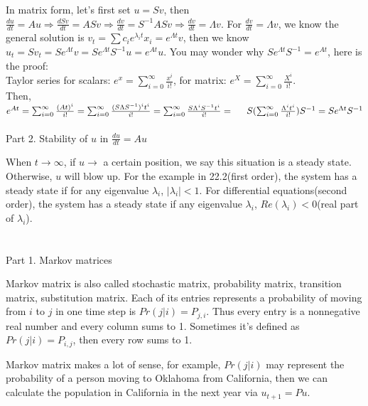 \documentclass{article}
\begin{document}
\begin{spacing}{1.5}
In matrix form, let's first set $u=Sv$, then $\frac{du}{dt}=Au \Rightarrow \frac{dSv}{dt}=ASv \Rightarrow \frac{dv}{dt}=S^{-1}ASv \Rightarrow \frac{dv}{dt}=
\Lambda v$. For $\frac{dv}{dt}=\Lambda v$, we know the general solution is $v_t=\sum c_i e^{\lambda_i t} x_i=e^{\Lambda t}v$, then we know $u_t=Sv_t=Se^{\Lambda t}v=Se^{\Lambda t}S^{-1}u=e^{At}u$. You may wonder why $Se^{\Lambda t}S^{-1}=e^{At}$, here is the proof:\\
\hspace*{0.5cm}Taylor series for scalars: $e^x=\sum_{i=0}^{\infty}\frac{x^i}{i!}$, for matrix: $e^X=\sum_{i=0}^{\infty}\frac{X^i}{i!}$.\\
\hspace*{0.5cm}Then, $e^{At}=\sum_{i=0}^{\infty}\frac{(At)^i}{i!} = \sum_{i=0}^{\infty}\frac{(S\Lambda S^{-1})^it^i}{i!} =  
\sum_{i=0}^{\infty}\frac{S\Lambda^iS^{-1}t^i}{i!} = \\
\hspace*{0.5cm}S (\sum_{i=0}^{\infty}\frac{\Lambda^it^i}{i!}) S^{-1} =
Se^{\Lambda t}S^{-1}$
\\\\Part 2. Stability of $u$ in $\frac{du}{dt}=Au$

When $t \rightarrow \infty$, if $u \rightarrow$ a certain position, we say this situation is a steady state. Otherwise, $u$ will blow up. For the example in 22.2(first order), the system has a steady state if for any eigenvalue $\lambda_i$, $|\lambda_i|<1$. For differential equations(second order), the system has a steady state if any eigenvalue $\lambda_i$, $Re(\lambda_i)<0$(real part of $\lambda_i$). 


\section{}
Part 1. Markov matrices

Markov matrix is also called stochastic matrix, probability matrix, transition matrix, substitution matrix. Each of its entries represents a probability of moving from $i$ to $j$ in one time step is $Pr(j|i)=P_{j, i}$. Thus every entry is a nonnegative real number and every column sums to 1. Sometimes it's defined as $Pr(j|i)=P_{i, j}$, then every row sums to 1. 

Markov matrix makes a lot of sense, for example, $Pr(j|i)$ may represent the probability of a person moving to Oklahoma from California, then we can calculate the population in California in the next year via $u_{t+1}=Pu$.


\end{spacing}
\end{document}
